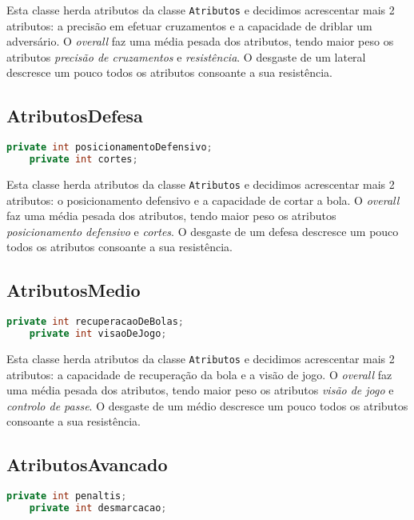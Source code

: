 \documentclass[a4paper]{report}
\begin{document}
    Esta classe herda atributos da classe \texttt{Atributos} e decidimos acrescentar mais 2 atributos: a precisão em efetuar cruzamentos e a capacidade de driblar um adversário.
    O \textit{overall} faz uma média pesada dos atributos, tendo maior peso os atributos \textit{precisão de cruzamentos} e \textit{resistência}. O desgaste de um lateral descresce um pouco todos os atributos consoante a sua resistência.
	
	\pagebreak
	
	\subsection{AtributosDefesa}
    \begin{lstlisting}[language=Java]
    private int posicionamentoDefensivo;
    private int cortes;
    \end{lstlisting}
    Esta classe herda atributos da classe \texttt{Atributos} e decidimos acrescentar mais 2 atributos: o posicionamento defensivo e a capacidade de cortar a bola.
    O \textit{overall} faz uma média pesada dos atributos, tendo maior peso os atributos \textit{posicionamento defensivo} e \textit{cortes}. O desgaste de um defesa descresce um pouco todos os atributos consoante a sua resistência.

        
        
    \subsection{AtributosMedio}
    \begin{lstlisting}[language=Java]
    private int recuperacaoDeBolas;
    private int visaoDeJogo;
    \end{lstlisting}
    
    Esta classe herda atributos da classe \texttt{Atributos} e decidimos acrescentar mais 2 atributos: a capacidade de recuperação da bola e a visão de jogo.
    O \textit{overall} faz uma média pesada dos atributos, tendo maior peso os atributos \textit{visão de jogo} e \textit{controlo de passe}. O desgaste de um médio descresce um pouco todos os atributos consoante a sua resistência.
    
    
    \subsection{AtributosAvancado}
    \begin{lstlisting}[language=Java]
    private int penaltis;
    private int desmarcacao;
    \end{lstlisting}
    
\end{document}
